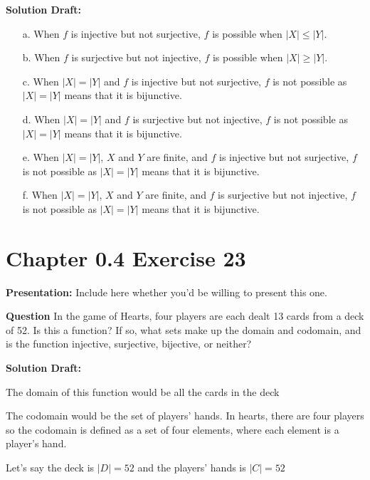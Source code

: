 \documentclass{article}
\begin{document}
\noindent\textbf{Solution Draft:} 

\begin{itemize}
    \item[a.] When \(f\) is injective but not surjective, $f$ is possible when $|X| \le |Y|$.
    \item[b.] When \(f\) is surjective but not injective, $f$ is possible when $|X| \ge |Y|$.
    \item[c.] When \(|X| = |Y|\) and \(f\) is injective but not surjective, $f$ is not possible as \(|X| = |Y|\) means that it is bijunctive.
    \item[d.] When \(|X| = |Y|\) and \(f\) is surjective but not injective, $f$ is not possible as \(|X| = |Y|\) means that it is bijunctive.
    \item[e.] When \(|X| = |Y|\), \(X\) and \(Y\) are finite, and \(f\) is injective but not surjective, $f$ is not possible as \(|X| = |Y|\) means that it is bijunctive.
    \item[f.] When \(|X| = |Y|\), \(X\) and \(Y\) are finite, and \(f\) is surjective but not injective, $f$ is not possible as \(|X| = |Y|\) means that it is bijunctive.
\end{itemize}

\section*{Chapter 0.4 Exercise 23}  

\noindent\textbf{Presentation:} Include here whether you'd be willing to present this one. 

\vspace{0.5cm} %

\noindent\textbf{Question}
In the game of Hearts, four players are each dealt 13 cards from a deck of 52. Is this a function? If so, what sets make up the domain and codomain, and is the function injective, surjective, bijective, or neither?


\noindent\textbf{Solution Draft:} 

The domain of this function would be all the cards in the deck

The codomain would be the set of players' hands. In hearts, there are four players so the codomain is defined as a set of four elements, where each element is a player's hand.

Let's say the deck is $|D| = 52$ and the players' hands is $|C| = 52$
\end{document}
